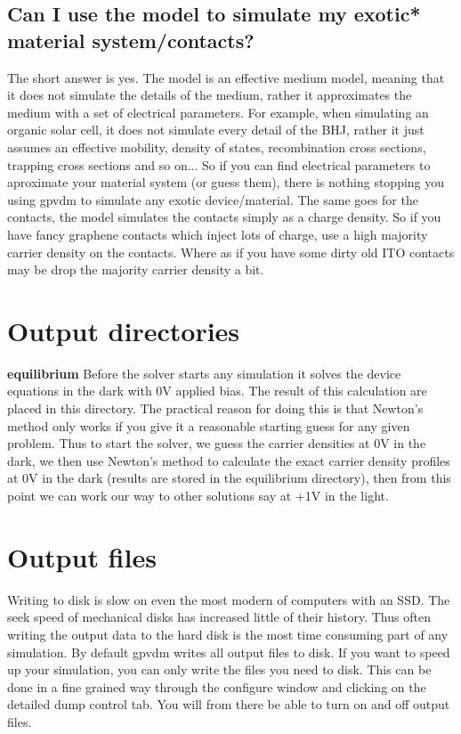 \subsection{Can I use the model to simulate my exotic* material system/contacts?}
The short answer is yes.  The model is an effective medium model, meaning that it does not simulate the details of the medium, rather it approximates the medium with a set of electrical parameters.  For example, when simulating an organic solar cell, it does not simulate every detail of the BHJ, rather it just assumes an effective mobility, density of states, recombination cross sections, trapping cross sections and so on...  So if you can find electrical parameters to aproximate your material system (or guess them), there is nothing stopping you using gpvdm to simulate any exotic device/material.  The same goes for the contacts, the model simulates the contacts simply as a charge density. So if you have fancy graphene contacts which inject lots of charge, use a high majority carrier density on the contacts.  Where as if you have some dirty old ITO contacts may be drop the majority carrier density a bit.

\newpage


\section{Output directories}
\textbf{equilibrium}\newline
Before the solver starts any simulation it solves the device equations in the dark with 0V applied bias.  The result of this calculation are placed in this directory.  The practical reason for doing this is that Newton's method only works if you give it a reasonable starting guess for any given problem.  Thus to start the solver, we guess the carrier densities at 0V in the dark, we then use Newton's method to calculate the exact carrier density profiles at 0V in the dark (results are stored in the equilibrium directory), then from this point we can work our way to other solutions say at +1V in the light.\cite{0953-8984-25-21-215301}
\newline

\section{Output files}
Writing to disk is slow on even the most modern of computers with an SSD.  The seek speed of mechanical disks has increased little of their history.  Thus often writing the output data to the hard disk is the most time consuming part of any simulation.  By default gpvdm writes all output files to disk.  If you want to speed up your simulation, you can only write the files you need to disk.  This can be done in a fine grained way through the configure window and clicking on the detailed dump control tab.  You will from there be able to turn on and off output files.

